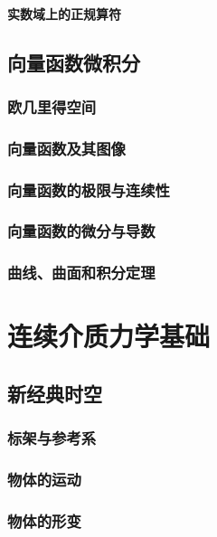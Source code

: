 \documentclass[zihao=-4,linespread=1.5,a4paper,heading=true,twoside]{ctexbook}
\theoremstyle{definition}
\theoremstyle{plain}
\begin{document}
\subsection{实数域上的正规算符}\label{sec:II.2.4.5}

\chapter{向量函数微积分}
\section{欧几里得空间}


\section{向量函数及其图像}


\section{向量函数的极限与连续性}


\section{向量函数的微分与导数}


\section{曲线、曲面和积分定理}


\part{连续介质力学基础}
\chapter{新经典时空}
\section{标架与参考系}


\section{物体的运动}


\section{物体的形变}

\end{document}

